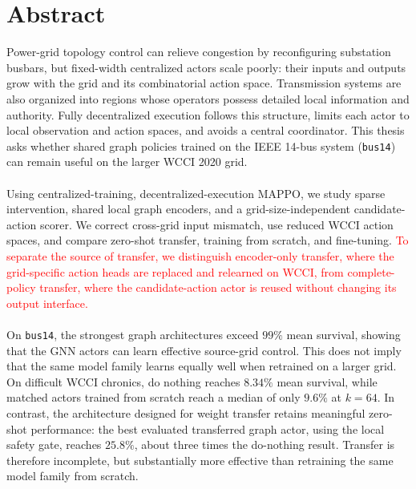 \documentclass[10pt,a4paper]{report}
\newcommand{\revision}[1]{{\color{red}#1}}
\newcommand{\newrevision}[1]{{\color{red}#1}}
\newcommand{\latestrevision}[1]{{\color{red}#1}}
\begin{document}
\chapter*{Abstract}
Power-grid topology control can relieve congestion by reconfiguring substation
busbars, but fixed-width centralized actors scale poorly: their inputs and
outputs grow with the grid and its combinatorial action space. Transmission
systems are also organized into regions whose operators possess detailed local
information and authority. Fully decentralized execution follows this
structure, limits each actor to local observation and action spaces, and avoids
a central coordinator. This thesis asks whether shared graph policies trained
on the IEEE 14-bus system (\texttt{bus14}) can remain useful on the larger WCCI
2020 grid.
\\
\\
Using centralized-training, decentralized-execution MAPPO, we study sparse
intervention, shared local graph encoders, and a grid-size-independent
candidate-action scorer. We correct cross-grid input mismatch, use reduced WCCI
action spaces, and compare zero-shot transfer, training from scratch, and
fine-tuning. \textcolor{red}{To separate the source of transfer, we distinguish
encoder-only transfer, where the grid-specific action heads are replaced and
relearned on WCCI, from complete-policy transfer, where the candidate-action
actor is reused without changing its output interface.}
\\
\\
On \texttt{bus14}, the strongest graph architectures exceed $99\%$ mean
survival, showing that the GNN actors can learn effective source-grid control.
This does not imply that the same model family learns equally well when
retrained on a larger grid. On difficult WCCI chronics, do nothing
reaches $8.34\%$ mean survival, while matched actors trained from scratch reach
a median of only $9.6\%$ at $k=64$. In contrast, the architecture designed for
weight transfer retains meaningful zero-shot performance: the best evaluated
transferred graph actor, using the local safety gate, reaches $25.8\%$, about
three times the do-nothing result. Transfer is therefore incomplete, but
substantially more effective than retraining the same model family from
scratch.
\par

\clearpage
\tableofcontents
\clearpage

\renewcommand{\revision}[1]{#1}
\renewcommand{\newrevision}[1]{#1}
\renewcommand{\latestrevision}[1]{#1}





\renewcommand{\revision}[1]{{\color{red}#1}}
\renewcommand{\newrevision}[1]{{\color{red}#1}}
\renewcommand{\latestrevision}[1]{{\color{red}#1}}







\appendix




\nocite{*}
\printbibliography
\end{document}
